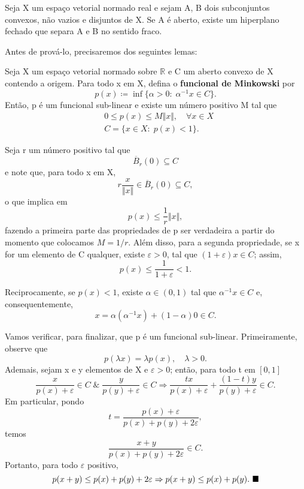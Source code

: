 \documentclass[../functional_analysis.tex]{subfiles}
\begin{document}
\hypertarget{first_geometric_hahn_banach}{\begin{theorem*}
		Seja X um espaço vetorial normado real e sejam A, B dois subconjuntos convexos, não vazios e disjuntos de X. Se A é aberto, existe um hiperplano fechado que separa A e B no sentido fraco.
	\end{theorem*}}
Antes de prová-lo, precisaremos dos seguintes lemas:
\hypertarget{minkowski_functional}{
	\begin{lemma*}
		Seja X um espaço vetorial normado sobre \(\mathbb{R}\) e C um aberto convexo de X contendo a origem. Para todo x em X, defina o \textbf{funcional de Minkowski} por
		\[
			p(x)\coloneqq \inf\{\alpha >0:\; \alpha^{-1}x\in C\}.
		\]
		Então, p é um funcional sub-linear e existe um número positivo M tal que
		\begin{align*}
			 & 0\leq p(x)\leq M\Vert x \Vert,\quad \forall x\in X \\
			 & C=\{x\in X:\; p(x)<1\}.
		\end{align*}
	\end{lemma*}
}
\begin{proof*}
	Seja r um número positivo tal que
	\[
		\overline{B}_r(0)\subseteq C
	\]
	e note que, para todo x em X,
	\[
		r \frac{x}{\Vert x \Vert}\in \overline{B}_r(0)\subseteq C,
	\]
	o que implica em
	\[
		p(x)\leq \frac{1}{r}\Vert x \Vert,
	\]
	fazendo a primeira parte das propriedades de p ser verdadeira a partir do momento que colocamos \(M=1/r\). Além disso, para a segunda propriedade, se x for um elemento de C qualquer, existe \(\varepsilon >0\), tal que \((1+\varepsilon )x\in C\); assim,
	\[
		p(x)\leq \frac{1}{1+\varepsilon }<1.
	\]

	Reciprocamente, se \(p(x)<1\), existe \(\alpha\in (0, 1) \) tal que \(\alpha^{-1}x\in C\) e, consequentemente,
	\[
		x=\alpha (\alpha ^{-1}x)+(1-\alpha )0\in C.
	\]

	Vamos verificar, para finalizar, que p é um funcional sub-linear. Primeiramente, observe que
	\[
		p(\lambda x)=\lambda p(x),\quad \lambda >0.
	\]
	Ademais, sejam x e y elementos de X e \(\varepsilon >0\); então, para todo t em \([0,1]\)
	\[
		\frac{x}{p(x)+\varepsilon }\in C \;\&\; \frac{y}{p(y)+\varepsilon }\in C \Rightarrow \frac{tx}{p(x)+\varepsilon } + \frac{(1-t)y}{p(y)+\varepsilon }\in C.
	\]
	Em particular, pondo
	\[
		t=\frac{p(x)+\varepsilon }{p(x)+p(y)+2\varepsilon },
	\]
	temos
	\[
		\frac{x+y}{p(x)+p(y)+2\varepsilon }\in C.
	\]
	Portanto, para todo \(\varepsilon \) positivo,
	\[
		p(x+y)\leq p(x)+p(y)+2\varepsilon  \Rightarrow p(x+y)\leq p(x)+p(y).\text{ $\blacksquare$}
	\]
\end{proof*}
\end{document}

